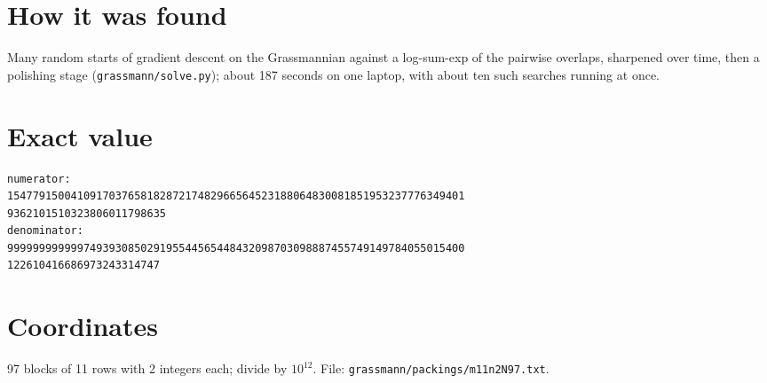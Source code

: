 \documentclass[11pt,a4paper]{article}
\begin{document}
\section{How it was found}
Many random starts of gradient descent on the Grassmannian against a log-sum-exp of the pairwise overlaps, sharpened over time, then a polishing stage (\texttt{grassmann/solve.py}); about 187 seconds on one laptop, with about ten such searches running at once.


\appendix
\section{Exact value}
{\small
\begin{verbatim}
numerator:
154779150041091703765818287217482966564523188064830081851953237776349401
9362101510323806011798635
denominator:
999999999999749393085029195544565448432098703098887455749149784055015400
122610416686973243314747
\end{verbatim}}

\section{Coordinates}
97 blocks of 11 rows with 2 integers each; divide by $10^{12}$. File: \texttt{grassmann/packings/m11n2N97.txt}.
{\tiny
\begin{multicols}{4}
\end{multicols}}
\end{document}
